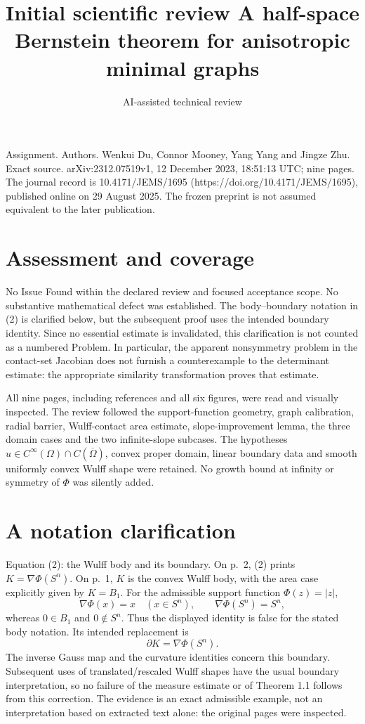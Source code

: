 \documentclass[10pt]{article}
\title{Initial scientific review
A half-space Bernstein theorem
for anisotropic minimal graphs}
\author{AI-assisted technical review}
\date{}
\begin{document}
\maketitle
Assignment. Authors. Wenkui Du, Connor Mooney, Yang Yang and Jingze Zhu. Exact source. arXiv:2312.07519v1, 12 December 2023, 18:51:13 UTC; nine pages. The journal record is 10.4171/JEMS/1695 (https://doi.org/10.4171/JEMS/1695), published online on 29 August 2025. The frozen preprint is not assumed equivalent to the later publication.\par
\section*{Assessment and coverage}
No Issue Found within the declared review and focused acceptance scope. No substantive mathematical defect was established. The body–boundary notation in (2) is clarified below, but the subsequent proof uses the intended boundary identity. Since no essential estimate is invalidated, this clarification is not counted as a numbered Problem. In particular, the apparent nonsymmetry problem in the contact-set Jacobian does not furnish a counterexample to the determinant estimate: the appropriate similarity transformation proves that estimate.\par
All nine pages, including references and all six figures, were read and visually inspected. The review followed the support-function geometry, graph calibration, radial barrier, Wulff-contact area estimate, slope-improvement lemma, the three domain cases and the two infinite-slope subcases. The hypotheses \(u\in C^\infty(\Omega)\cap C(\overline\Omega)\), convex proper domain, linear boundary data and smooth uniformly convex Wulff shape were retained. No growth bound at infinity or symmetry of \(\Phi\) was silently added.\par
\section*{A notation clarification}
Equation (2): the Wulff body and its boundary. On p. 2, (2) prints \(K=\nabla\Phi(S^n)\). On p. 1, \(K\) is the convex Wulff body, with the area case explicitly given by \(K=B_1\). For the admissible support function \(\Phi(z)=|z|\), \[\nabla\Phi(x)=x\quad(x\in S^n),\qquad
 \nabla\Phi(S^n)=S^n,\] whereas \(0\in B_1\) and \(0\notin S^n\). Thus the displayed identity is false for the stated body notation. Its intended replacement is \[\partial K=\nabla\Phi(S^n).\] The inverse Gauss map and the curvature identities concern this boundary. Subsequent uses of translated/rescaled Wulff shapes have the usual boundary interpretation, so no failure of the measure estimate or of Theorem 1.1 follows from this correction. The evidence is an exact admissible example, not an interpretation based on extracted text alone: the original pages were inspected.\par
\end{document}
